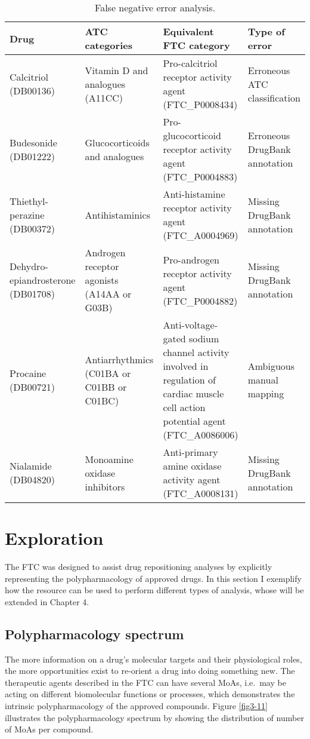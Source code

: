 \begin{table}[htbp]
\scriptsize
\begin{tabular}{|p{2cm}|p{4cm}|p{4cm}|p{4cm}|}
\hline
\textbf{Drug} & \textbf{ATC categories} & \textbf{Equivalent FTC category} & \textbf{Type of error} \\ \hline
Calcitriol (DB00136) & Vitamin D and analogues (A11CC) & Pro-calcitriol receptor activity agent (FTC\_P0008434) & Erroneous ATC classification \\ \hline
Budesonide (DB01222) & Glucocorticoids and analogues & Pro-glucocorticoid receptor activity agent (FTC\_P0004883) & Erroneous DrugBank annotation \\ \hline
Thiethyl-perazine (DB00372) & Antihistaminics & Anti-histamine receptor activity agent (FTC\_A0004969) & Missing DrugBank annotation \\ \hline
Dehydro-epiandrosterone (DB01708) & Androgen receptor agonists (A14AA or G03B) & Pro-androgen receptor activity agent (FTC\_P0004882) & Missing DrugBank annotation \\ \hline
Procaine (DB00721) & Antiarrhythmics (C01BA or C01BB or C01BC) & Anti-voltage-gated sodium channel activity involved in regulation of cardiac muscle cell action potential agent (FTC\_A0086006) & Ambiguous manual mapping \\ \hline
Nialamide (DB04820) & Monoamine oxidase inhibitors & Anti-primary amine oxidase activity agent (FTC\_A0008131) & Missing DrugBank annotation \\ \hline
\end{tabular}
\caption{False negative error analysis.}
\label{table:falsenegatives}
\end{table}

\section{Exploration}
The FTC was designed to assist drug repositioning analyses by explicitly representing the polypharmacology of approved drugs. In this section I exemplify how the resource can be used to perform different types of analysis, whose will be extended in Chapter 4.

\subsection{Polypharmacology spectrum}
The more information on a drug's molecular targets and their physiological roles, the more opportunities exist to re-orient a drug into doing something new. The therapeutic agents described in the FTC can have several MoAs, i.e.\ may be acting on different biomolecular functions or processes, which demonstrates the intrinsic polypharmacology of the approved compounds. 
Figure \ref{fig3-11} illustrates the polypharmacology spectrum by showing the distribution of number of MoAs per compound.

